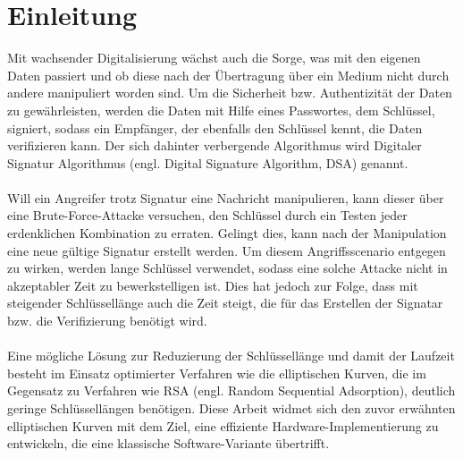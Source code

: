 \chapter{Einleitung}
Mit wachsender Digitalisierung wächst auch die Sorge, was mit den eigenen Daten passiert und ob diese nach der Übertragung über ein Medium nicht durch andere manipuliert worden sind. Um die Sicherheit bzw. Authentizität der Daten zu gewährleisten, werden die Daten mit Hilfe eines Passwortes, dem Schlüssel, signiert, sodass ein Empfänger, der ebenfalls den Schlüssel kennt, die Daten verifizieren kann. Der sich dahinter verbergende Algorithmus wird Digitaler Signatur Algorithmus (engl. Digital Signature Algorithm, DSA) genannt.
\\ \\
Will ein Angreifer trotz Signatur eine Nachricht manipulieren, kann dieser über eine Brute-Force-Attacke versuchen, den Schlüssel durch ein Testen jeder erdenklichen Kombination zu erraten. Gelingt dies, kann nach der Manipulation eine neue gültige Signatur erstellt werden. Um diesem Angriffsscenario entgegen zu wirken, werden lange Schlüssel verwendet, sodass eine solche Attacke nicht in akzeptabler Zeit zu bewerkstelligen ist. Dies hat jedoch zur Folge, dass mit steigender Schlüssellänge auch die Zeit steigt, die für das Erstellen der Signatar bzw. die Verifizierung benötigt wird. 
\\ \\
Eine mögliche Lösung zur Reduzierung der Schlüssellänge und damit der Laufzeit besteht im Einsatz optimierter Verfahren wie die elliptischen Kurven, die im Gegensatz zu Verfahren wie RSA (engl. Random Sequential Adsorption), deutlich geringe Schlüssellängen benötigen. Diese Arbeit widmet sich den zuvor erwähnten elliptischen Kurven mit dem Ziel, eine effiziente Hardware-Implementierung zu entwickeln, die eine klassische Software-Variante übertrifft.
